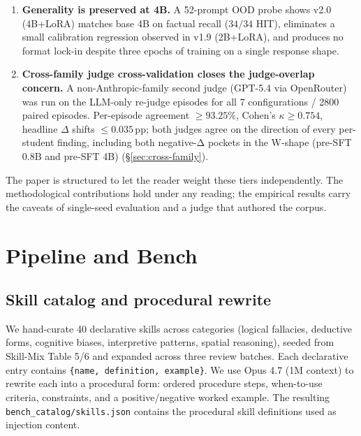 \documentclass[10pt]{article}
\begin{document}
\begin{enumerate}[leftmargin=*, resume]
  \item \textbf{Generality is preserved at 4B.} A 52-prompt OOD probe shows v2.0 (4B+LoRA) matches base 4B on factual recall ($34/34$ HIT), eliminates a small calibration regression observed in v1.9 (2B+LoRA), and produces no format lock-in despite three epochs of training on a single response shape.
  \item \textbf{Cross-family judge cross-validation closes the judge-overlap concern.} A non-Anthropic-family second judge (GPT-5.4 via OpenRouter) was run on the LLM-only re-judge episodes for all 7 configurations / 2800 paired episodes. Per-episode agreement $\geq 93.25\%$, Cohen's $\kappa \geq 0.754$, headline $\Delta$ shifts $\leq 0.035$\,pp; both judges agree on the direction of every per-student finding, including both negative-Δ pockets in the W-shape (pre-SFT 0.8B and pre-SFT 4B) (\S\ref{sec:cross-family}).
\end{enumerate}

The paper is structured to let the reader weight these tiers independently. The methodological contributions hold under any reading; the empirical results carry the caveats of single-seed evaluation and a judge that authored the corpus.

\section{Pipeline and Bench}

\subsection{Skill catalog and procedural rewrite}
We hand-curate 40 declarative skills across categories (logical fallacies, deductive forms, cognitive biases, interpretive patterns, spatial reasoning), seeded from Skill-Mix Table 5/6 \citep{yu2024skillmix} and expanded across three review batches. Each declarative entry contains \texttt{\{name, definition, example\}}. We use Opus 4.7 (1M context) to rewrite each into a procedural form: ordered procedure steps, when-to-use criteria, constraints, and a positive/negative worked example. The resulting \texttt{bench\_catalog/skills.json} contains the procedural skill definitions used as injection content.
\end{document}
